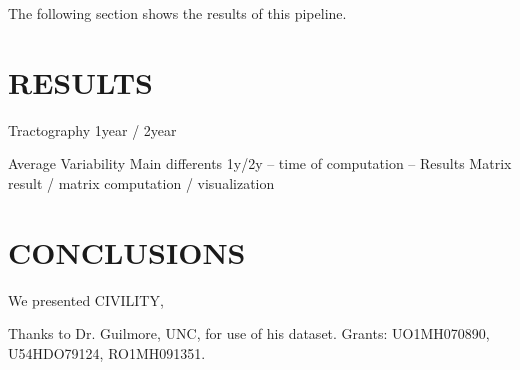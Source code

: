 \documentclass[]{spie}  %
\begin{document}
The following section shows the results of this pipeline. 

\section{RESULTS} 


Tractography 1year / 2year 


Average 
Variability
Main differents 1y/2y
	-- time of computation 
	-- 
Results Matrix result / matrix computation / visualization 



\section{CONCLUSIONS} 

We presented CIVILITY,



\acknowledgments

Thanks to Dr. Guilmore, UNC, for use of his dataset. Grants: UO1MH070890, U54HDO79124, RO1MH091351. 


\end{document}
